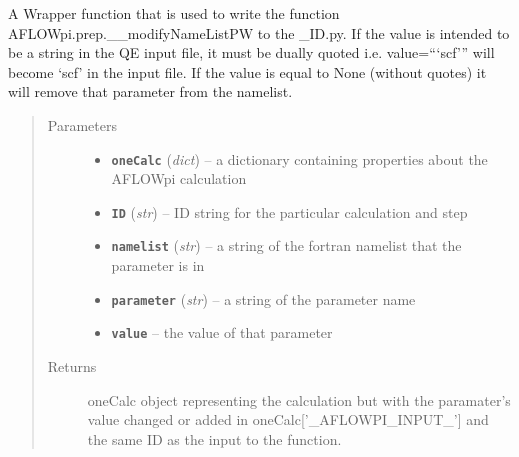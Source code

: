 \documentclass[letterpaper,10pt,english]{sphinxmanual}
\begin{document}

\begin{fulllineitems}
\label{prep:prep.__modifyNamelistPW}
A Wrapper function that is used to write the function AFLOWpi.prep.\_\_modifyNameListPW
to the \_ID.py. If the value is intended to be a string in the QE input file, it must
be dually quoted i.e. value=```scf''' will become `scf' in the input file. If the value
is equal to None (without quotes) it will remove that parameter from the namelist.
\begin{quote}\begin{description}
\item[{Parameters}] \leavevmode\begin{itemize}
\item {} 
\textbf{\texttt{oneCalc}} (\emph{dict}) -- a dictionary containing properties about the AFLOWpi calculation

\item {} 
\textbf{\texttt{ID}} (\emph{str}) -- ID string for the particular calculation and step

\item {} 
\textbf{\texttt{namelist}} (\emph{str}) -- a string of the fortran namelist that the parameter is in

\item {} 
\textbf{\texttt{parameter}} (\emph{str}) -- a string of the parameter name

\item {} 
\textbf{\texttt{value}} -- the value of that parameter

\end{itemize}

\item[{Returns}] \leavevmode
oneCalc object representing the calculation but with the paramater's value
changed or added in oneCalc{[}'\_AFLOWPI\_INPUT\_'{]} and the same ID as the input to
the function.

\end{description}\end{quote}

\end{fulllineitems}

\end{document}
